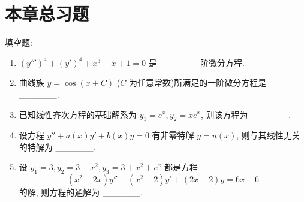 \documentclass[lang=cn,11pt]{elegantbook}
\begin{document}
\section{本章总习题}

\begin{exercise}[基本概念与方程求解]
填空题:
\begin{enumerate}
    \item[(1)] $(y''')^4+(y')^4+x^3+x+1=0$ 是 \_\_\_\_\_\_ 阶微分方程.
    \item[(2)] 曲线族 $y=\cos(x+C)$ ($C$ 为任意常数)所满足的一阶微分方程是 \_\_\_\_\_\_.
    \item[(3)] 已知线性齐次方程的基础解系为 $y_1=e^x, y_2=xe^x$, 则该方程为 \_\_\_\_\_\_.
    \item[(4)] 设方程 $y''+a(x)y'+b(x)y=0$ 有非零特解 $y=u(x)$, 则与其线性无关的特解为 \_\_\_\_\_\_.
    \item[(5)] 设 $y_1=3, y_2=3+x^2, y_3=3+x^2+e^x$ 都是方程
    \[
    (x^2-2x)y''-(x^2-2)y'+(2x-2)y=6x-6
    \]
    的解, 则方程的通解为 \_\_\_\_\_\_.
\end{enumerate}
\end{exercise}
\end{document}
